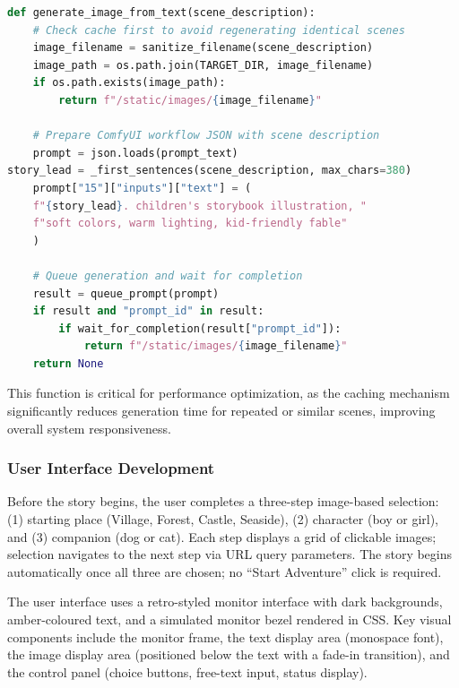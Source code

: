 \documentclass[12pt,a4paper]{article}
\begin{document}
\clearpage
    \begin{lstlisting}[language=Python, caption={Image generation function with caching and ComfyUI integration}, basicstyle=\ttfamily\footnotesize, showspaces=false, showstringspaces=false]
def generate_image_from_text(scene_description):
    # Check cache first to avoid regenerating identical scenes
    image_filename = sanitize_filename(scene_description)
    image_path = os.path.join(TARGET_DIR, image_filename)
    if os.path.exists(image_path):
        return f"/static/images/{image_filename}"
    
    # Prepare ComfyUI workflow JSON with scene description
    prompt = json.loads(prompt_text)
story_lead = _first_sentences(scene_description, max_chars=380)
    prompt["15"]["inputs"]["text"] = (
    f"{story_lead}. children's storybook illustration, "
    f"soft colors, warm lighting, kid-friendly fable"
    )
    
    # Queue generation and wait for completion
    result = queue_prompt(prompt)
    if result and "prompt_id" in result:
        if wait_for_completion(result["prompt_id"]):
            return f"/static/images/{image_filename}"
    return None
    \end{lstlisting}

    This function is critical for performance optimization, as the caching mechanism significantly reduces generation time for repeated or similar scenes, improving overall system responsiveness.

    \subsubsection{User Interface Development}

Before the story begins, the user completes a three-step image-based selection: (1) starting place (Village, Forest, Castle, Seaside), (2) character (boy or girl), and (3) companion (dog or cat). Each step displays a grid of clickable images; selection navigates to the next step via URL query parameters. The story begins automatically once all three are chosen; no ``Start Adventure'' click is required.

The user interface uses a retro-styled monitor interface with dark backgrounds, amber-coloured text, and a simulated monitor bezel rendered in CSS. Key visual components include the monitor frame, the text display area (monospace font), the image display area (positioned below the text with a fade-in transition), and the control panel (choice buttons, free-text input, status display).
\end{document}
